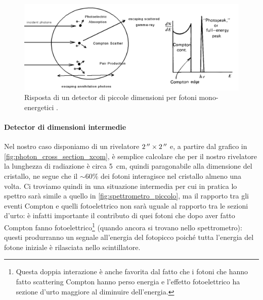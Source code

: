   \begin{figure}[h]
 	\centering
 	\includegraphics[width=\textwidth]{spettrometro_piccolo}
 	\caption{\label{fig:spettrometro_piccolo}Risposta di un detector di piccole dimensioni per fotoni mono-energetici \cite{6}.}
 \end{figure}
 
 \paragraph{Detector di dimensioni intermedie}\label{par:spettrometro_intermedio}
 Nel nostro caso disponiamo di un rivelatore $\SI2{''}\times\SI2{''}$ e, a partire dal grafico in \autoref{fig:photon_cross_section_xcom}, è semplice calcolare che per il nostro rivelatore la lunghezza di radiazione è circa \SI{5}{cm}, quindi paragonabile alla dimensione del cristallo, ne segue che il $\sim \SI{60}\%$ dei fotoni interagisce nel cristallo almeno una volta. Ci troviamo quindi in una situazione intermedia per cui in pratica lo spettro sarà simile a quello in \autoref{fig:spettrometro_piccolo}, ma il rapporto tra gli eventi Compton e quelli fotoelettrico non sarà uguale al rapporto tra le sezioni d'urto: è infatti importante il contributo di quei fotoni che dopo aver fatto Compton fanno fotoelettrico\footnote{Questa doppia interazione è anche favorita dal fatto che i fotoni che hanno fatto scattering Compton hanno perso energia e l'effetto fotoelettrico ha sezione d'urto maggiore al diminuire dell'energia.} (quando ancora si trovano nello spettrometro): questi produrranno un segnale all'energia del fotopicco poiché tutta l'energia del fotone iniziale è rilasciata nello scintillatore. 
 
